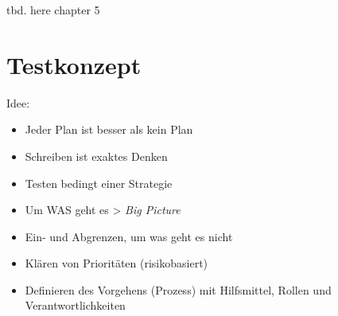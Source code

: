 tbd. here chapter 5

\section{Testkonzept}

Idee:
\begin{itemize}
	\item Jeder Plan ist besser als kein Plan
	\item Schreiben ist exaktes Denken
	\item Testen bedingt einer Strategie
	\item Um WAS geht es > \emph{Big Picture}
	\item Ein- und Abgrenzen, um was geht es nicht
	\item Klären von Prioritäten (risikobasiert)
	\item Definieren des Vorgehens (Prozess) mit Hilfsmittel, Rollen und Verantwortlichkeiten
\end{itemize}

